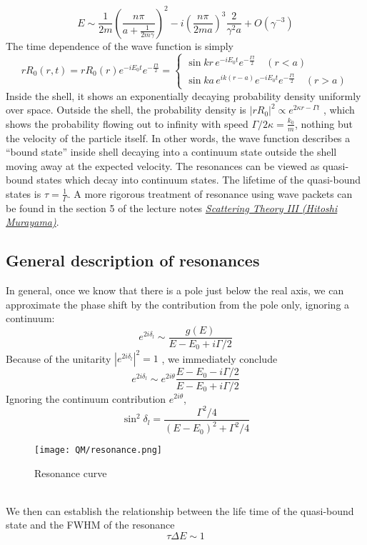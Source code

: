 \[E \sim \frac{1}{2m} \left( \frac{n\pi}{a + \frac{1}{2m\gamma}}\right)^2 - i \left( \frac{n\pi}{2ma}\right)^3 \frac{2}{\gamma^2 a} + O(\gamma^{-3})\]
The time dependence of the wave function is simply
\[rR_0(r,t) = rR_0(r) e^{-iE_0t} e^{-\frac{\Gamma t}{2}} = \begin{cases} \sin kr \, e^{-iE_0t} e^{-\frac{\Gamma t}{2}} \quad (r<a) \\\sin ka \,  e^{ik(r-a)} e^{-iE_0t} e^{-\frac{\Gamma t}{2}} \quad (r > a) \end{cases}\]
Inside the shell, it shows an exponentially decaying probability density uniformly over space.
Outside the shell, the probability density is $|rR_0|^2 \propto e^{2\kappa r-\Gamma t}$ , which shows the probability flowing out to infinity with speed $\Gamma/2\kappa = \frac{k_0}{m}$,
nothing but the velocity of the particle itself. In other words, the wave function describes a ``bound state'' inside shell decaying into a continuum state outside the shell moving away at the expected velocity. The resonances can be viewed as
quasi-bound states which decay into continuum states. The lifetime of the quasi-bound states is $\tau = \frac{1}{\Gamma}$.
A more rigorous treatment of resonance using wave packets can be found in the section 5 of the lecture notes 
\href{http://hitoshi.berkeley.edu/221B/index.html}{\emph{Scattering Theory III (Hitoshi Murayama)}}.

\subsection{General description of resonances}
In general, once we know that there is a pole just below the real axis, we can approximate the phase shift by the contribution from the pole only, ignoring a continuum:
\[e^{2i\delta_l} \sim \frac{g(E)}{E-E_0 + i\Gamma/2}\]
Because of the unitarity $|e^{2i\delta_l}|^2 = 1$ , we immediately conclude
\[ e^{2i\delta_l} \sim e^{2i\theta}\frac{E-E_0-i\Gamma/2}{E-E_0 + i\Gamma/2} \]
Ignoring the continuum contribution $e^{2i\theta}$,
\[\sin^2 \delta_l = \frac{\Gamma^2/4}{(E-E_0)^2+\Gamma^2/4}\]
\begin{figure}[!h]
	\centering
	\texttt{[image: QM/resonance.png]}
	\caption{Resonance curve}
\end{figure}\\
We then can establish the relationship between the life time of the quasi-bound state and the FWHM of the resonance
\[\tau \Delta E \sim 1\]

